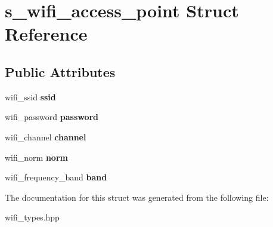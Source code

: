 \hypertarget{structs__wifi__access__point}{}\section{s\+\_\+wifi\+\_\+access\+\_\+point Struct Reference}
\label{structs__wifi__access__point}
\subsection*{Public Attributes}
\begin{DoxyCompactItemize}
\item 
\mbox{\label{structs__wifi__access__point_a838f0f789f6b491264b7a80368f2bf79}} 
wifi\+\_\+ssid {\bfseries ssid}
\item 
\mbox{\label{structs__wifi__access__point_addbd8538051734cf788f9309afa5fb41}} 
wifi\+\_\+password {\bfseries password}
\item 
\mbox{\label{structs__wifi__access__point_ae1b6af887030b3fd096c51852667b1a2}} 
wifi\+\_\+channel {\bfseries channel}
\item 
\mbox{\label{structs__wifi__access__point_a4d2b86f50607942d75dfa43c910f0021}} 
wifi\+\_\+norm {\bfseries norm}
\item 
\mbox{\label{structs__wifi__access__point_abe261f7eaf54825ff511118a034c8a12}} 
wifi\+\_\+frequency\+\_\+band {\bfseries band}
\end{DoxyCompactItemize}


The documentation for this struct was generated from the following file\+:\begin{DoxyCompactItemize}
\item 
wifi\+\_\+types.\+hpp\end{DoxyCompactItemize}
